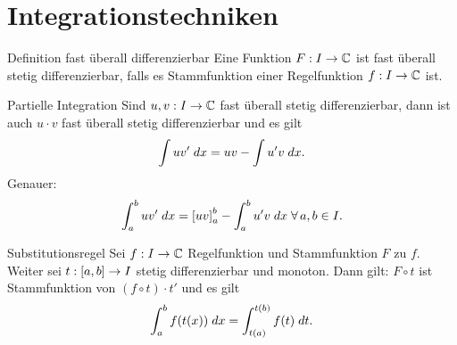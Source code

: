 \documentclass[main.tex]{subfiles}
\begin{document}
\section*{Integrationstechniken}

\begin{karte}{Definition fast überall differenzierbar}
    Eine Funktion \( \abb{F}{I}{\C} \) ist fast überall 
    stetig differenzierbar, falls es Stammfunktion einer 
    Regelfunktion \( \abb{f}{I}{\C} \) ist.
\end{karte}

\begin{karte}{Partielle Integration}
    Sind \(\abb{u,v}{I}{\C}\) fast überall stetig 
    differenzierbar, dann ist auch 
    \( u \cdot v \) fast überall stetig differenzierbar und 
    es gilt 
    \[ \int u v' \dx = uv - \int u' v \dx. \]
    Genauer: 
    \[ \integral{uv'}{a}{b} 
    = \left[ uv \right]_a^b - \integral{u'v}{a}{b} 
    \;\forall a,b\in I. \]
\end{karte}

\begin{karte}{Substitutionsregel}
    Sei \( \abb{f}{I}{\C} \) Regelfunktion    
    und Stammfunktion \(F\) zu \(f\).
    Weiter sei \( \abb{t}{[a,b]}{I} \) 
    stetig differenzierbar und monoton.
    Dann gilt:    
    \( F \circ t \) ist Stammfunktion von 
    \( (f\circ t) \cdot t' \)
    und es gilt 
    \[ \integral{f(t(x))}{a}{b} 
    = \integralx{f(t)}{t(a)}{t(b)}{t}. \]
\end{karte}
\end{document}
